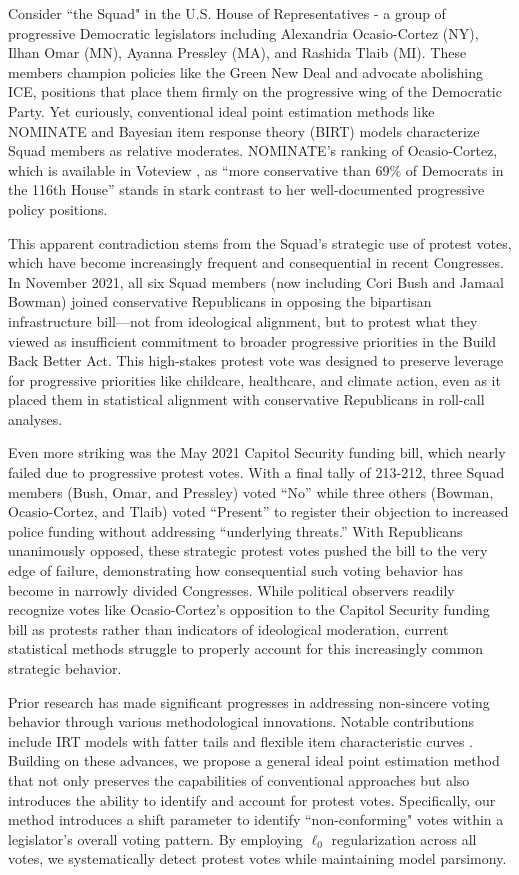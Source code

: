 \documentclass[11pt]{article}
\begin{document}
Consider ``the Squad" in the U.S. House of Representatives - a group of progressive Democratic legislators including Alexandria Ocasio-Cortez (NY), Ilhan Omar (MN), Ayanna Pressley (MA), and Rashida Tlaib (MI). These members champion policies like the Green New Deal and advocate abolishing ICE, positions that place them firmly on the progressive wing of the Democratic Party. Yet curiously, conventional ideal point estimation methods like NOMINATE and Bayesian item response theory (BIRT) models characterize Squad members as relative moderates. NOMINATE's ranking of Ocasio-Cortez, which is available in Voteview \citep{voteview2022}, as ``more conservative than 69\% of Democrats in the 116th House'' stands in stark contrast to her well-documented progressive policy positions.

This apparent contradiction stems from the Squad's strategic use of protest votes, which have become increasingly frequent and consequential in recent Congresses. In November 2021, all six Squad members (now including Cori Bush and Jamaal Bowman) joined conservative Republicans in opposing the bipartisan infrastructure bill—not from ideological alignment, but to protest what they viewed as insufficient commitment to broader progressive priorities in the Build Back Better Act. This high-stakes protest vote was designed to preserve leverage for progressive priorities like childcare, healthcare, and climate action, even as it placed them in statistical alignment with conservative Republicans in roll-call analyses.

Even more striking was the May 2021 Capitol Security funding bill, which nearly failed due to progressive protest votes. With a final tally of 213-212, three Squad members (Bush, Omar, and Pressley) voted ``No'' while three others (Bowman, Ocasio-Cortez, and Tlaib) voted ``Present'' to register their objection to increased police funding without addressing ``underlying threats.'' With Republicans unanimously opposed, these strategic protest votes pushed the bill to the very edge of failure, demonstrating how consequential such voting behavior has become in narrowly divided Congresses. While political observers readily recognize votes like Ocasio-Cortez's opposition to the Capitol Security funding bill as protests rather than indicators of ideological moderation, current statistical methods struggle to properly account for this increasingly common strategic behavior.


Prior research has made significant progresses in addressing non-sincere voting behavior through various methodological innovations. Notable contributions include IRT models with fatter tails \citep{Gelman2005} and flexible item characteristic curves \citep{Montgomery2020, Montgomery2023}. Building on these advances, we propose a general ideal point estimation method that not only preserves the capabilities of conventional approaches but also introduces the ability to identify and account for protest votes. Specifically, our method introduces a shift parameter to identify ``non-conforming" votes within a legislator's overall voting pattern. By employing $\ell_0$ regularization across all votes, we systematically detect protest votes while maintaining model parsimony. 
\end{document}
